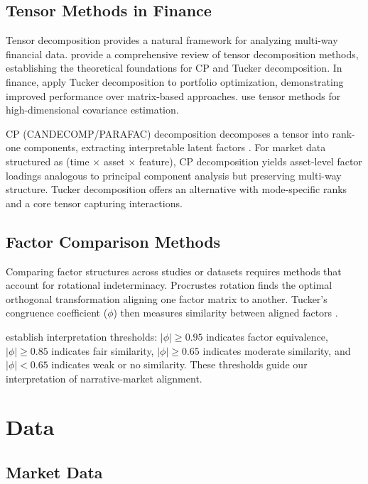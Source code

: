 \documentclass[11pt,twocolumn]{article}
\begin{document}
\subsection{Tensor Methods in Finance}

Tensor decomposition provides a natural framework for analyzing multi-way financial data. \citet{kolda2009tensor} provide a comprehensive review of tensor decomposition methods, establishing the theoretical foundations for CP and Tucker decomposition. In finance, \citet{wang2020tensor} apply Tucker decomposition to portfolio optimization, demonstrating improved performance over matrix-based approaches. \citet{chen2021tensor} use tensor methods for high-dimensional covariance estimation.

CP (CANDECOMP/PARAFAC) decomposition decomposes a tensor into rank-one components, extracting interpretable latent factors \citep{harshman1970foundations}. For market data structured as (time $\times$ asset $\times$ feature), CP decomposition yields asset-level factor loadings analogous to principal component analysis but preserving multi-way structure. Tucker decomposition offers an alternative with mode-specific ranks and a core tensor capturing interactions.

\subsection{Factor Comparison Methods}

Comparing factor structures across studies or datasets requires methods that account for rotational indeterminacy. Procrustes rotation \citep{schonemann1966generalized} finds the optimal orthogonal transformation aligning one factor matrix to another. Tucker's congruence coefficient ($\phi$) then measures similarity between aligned factors \citep{tucker1951method, lorenzo2006tuckers}.

\citet{lorenzo2006tuckers} establish interpretation thresholds: $|\phi| \geq 0.95$ indicates factor equivalence, $|\phi| \geq 0.85$ indicates fair similarity, $|\phi| \geq 0.65$ indicates moderate similarity, and $|\phi| < 0.65$ indicates weak or no similarity. These thresholds guide our interpretation of narrative-market alignment.

\section{Data}
\label{sec:data}

\subsection{Market Data}
\end{document}
